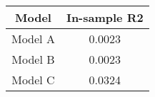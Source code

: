 \begin{tabular}{cc}
\hline
  Model  &  In-sample R2  \\
\hline
 Model A &     0.0023     \\
 Model B &     0.0023     \\
 Model C &     0.0324     \\
\hline
\end{tabular}